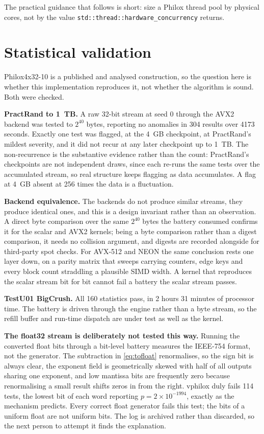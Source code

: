 \documentclass[acmsmall,screen,review]{acmart}
\theoremstyle{acmdefinition}
\newcommand{\code}[1]{\texttt{#1}}
\begin{document}
The practical guidance that follows is short: size a Philox thread pool by
physical cores, not by the value \code{std::thread::hardware\_concurrency}
returns.

\section{Statistical validation}\label{sec:stat}

Philox4x32-10 is a published and analysed construction, so the question here is
whether this implementation reproduces it, not whether the algorithm is sound.
Both were checked.

\textbf{PractRand to 1~TB.} A raw 32-bit stream at seed 0 through the AVX2
backend was tested to $2^{40}$ bytes, reporting no anomalies in 304 results
over 4173 seconds. Exactly one test was flagged, at the 4~GB checkpoint, at
PractRand's mildest severity, and it did not recur at any later checkpoint up to
1~TB. The non-recurrence is the substantive evidence rather than the count:
PractRand's checkpoints are not independent draws, since each re-runs the same
tests over the accumulated stream, so real structure keeps flagging as data
accumulates. A flag at 4~GB absent at 256 times the data is a fluctuation.

\textbf{Backend equivalence.} The backends do not produce similar streams, they
produce identical ones, and this is a design invariant rather than an
observation. A direct byte comparison over the same $2^{40}$ bytes the battery
consumed confirms it for the scalar and AVX2 kernels; being a byte comparison
rather than a digest comparison, it needs no collision argument, and digests are
recorded alongside for third-party spot checks. For AVX-512 and NEON the same
conclusion rests one layer down, on a parity matrix that sweeps carrying
counters, edge keys and every block count straddling a plausible SIMD width. A
kernel that reproduces the scalar stream bit for bit cannot fail a battery the
scalar stream passes.

\textbf{TestU01 BigCrush.} All 160 statistics pass, in 2 hours 31 minutes of
processor time. The battery is driven through the engine rather than a byte
stream, so the refill buffer and run-time dispatch are under test as well as the
kernel.

\textbf{The float32 stream is deliberately not tested this way.} Running the
converted float bits through a bit-level battery measures the IEEE-754 format,
not the generator. The subtraction in \cref{eq:tofloat} renormalises, so the
sign bit is always clear, the exponent field is geometrically skewed with half
of all outputs sharing one exponent, and low mantissa bits are frequently zero
because renormalising a small result shifts zeros in from the right. vphilox
duly fails 114 tests, the lowest bit of each word reporting
$p = 2 \times 10^{-1994}$, exactly as the mechanism predicts. Every correct
float generator fails this test; the bits of a uniform float are not uniform
bits. The log is archived rather than discarded, so the next person to attempt
it finds the explanation.
\end{document}
